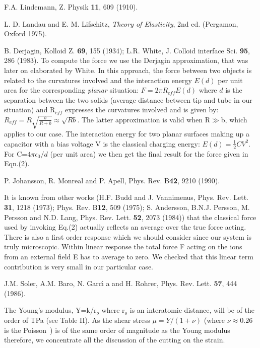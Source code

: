 \begin{multicols}{2}
\begin{thebibliography}{99}
 F.A. Lindemann, Z. Physik {\bf 11}, 609 (1910).

 L. D. Landau and E. M. Lifschitz, {\em Theory of Elasticity},
2nd ed. (Pergamon, Oxford 1975).

 B. Derjagin, Kolloid Z. {\bf 69}, 155 (1934);
L.R. White, J. Colloid interface Sci. {\bf 95}, 286 (1983).
To compute the force we use the
Derjagin approximation, that was later on elaborated by
White. In this approach, the force between two
objects is related to the curvatures involved and the interaction
energy $E(d)$ per unit area for the corresponding {\em planar}
situation: $F= 2\pi R_{eff}E(d)$
where $d$ is the separation between the two solids (average distance
between tip and tube in our situation) and R$_{eff}$ expresses the
curvatures involved and is given by:
$ R_{eff}=R\sqrt{\frac{b}{R+b}}\approx \sqrt{Rb}$.
The latter approximation is valid when R$\gg $b, which applies to
our case. The interaction energy for two planar surfaces making up
a capacitor with a bias voltage V is the classical charging
energy: $E(d)=\frac{1}{2}CV^{2}$.
For C=$4\pi \epsilon _{0}/d$ (per unit area) we then get the final
result for the force given in Eqn.(2).

 P. Johansson, R. Monreal and P. Apell, Phys. Rev. B{\bf 42}, 9210 (1990).

 It is known from other works
(H.F. Budd and J. Vannimenus, Phys. Rev. Lett. {\bf 31}, 1218
(1973); Phys. Rev. B{\bf 12}, 509 (1975);
S. Andersson, B.N.J. Persson, M. Persson and N.D. Lang,
Phys. Rev. Lett. {\bf 52}, 2073 (1984))
that the classical
force used by invoking Eq.(2) actually reflects an average over the true
force acting. There is also a first order
response which we should consider since our system is truly microscopic.
Within linear response the total force F acting on the ions from an
external field E has to average to zero. We checked that
this linear term contribution is very small in our particular case.

 J.M. Soler, A.M. Baro, N. Garc\'{\i} a and H. Rohrer, Phys. Rev.
Lett. {\bf 57}, 444 (1986).

 The Young's modulus, Y=k/r$_{o}$ where r$_{o}$
is an interatomic distance, will be of the order of TPa (see Table
II). As the shear stress $\mu =Y/(1+\nu )$ (where $\nu \approx
0.26$ is the Poisson~\cite{Hernandez}) is of the same order of magnitude as
the Young modulus therefore, we concentrate all the discussion of
the cutting on the strain.


\end{thebibliography}
\end{multicols}
